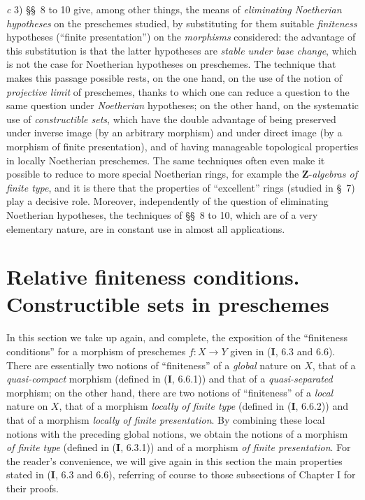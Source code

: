 \medskip
\noindent
\emph{c} 3) §§~8 to 10 give, among other things, the means of
\emph{eliminating Noetherian hypotheses} on the preschemes studied, by
substituting for them suitable \emph{finiteness} hypotheses (``finite
presentation'') on the \emph{morphisms} considered: the advantage of this
substitution is that the latter hypotheses are \emph{stable under base
change}, which is not the case for Noetherian hypotheses on preschemes. The
technique that makes this passage possible rests, on the one hand, on the use
of the notion of \emph{projective limit} of preschemes, thanks to which one
can reduce a question to the same question under \emph{Noetherian}
hypotheses; on the other hand, on the systematic use of
\emph{constructible sets}, which have the double advantage of being preserved
under inverse image (by an arbitrary
morphism) and under direct image (by a morphism of finite presentation), and
of having manageable topological properties in locally Noetherian
preschemes. The same techniques often even make it possible to reduce to
more special Noetherian rings, for example the
$\mathbf Z$-\emph{algebras of finite type}, and it is there that the
properties of ``excellent'' rings (studied in §~7) play a decisive role.
Moreover, independently of the question of eliminating Noetherian
hypotheses, the techniques of §§~8 to 10, which are of a very elementary
nature, are in constant use in almost all applications.

\setcounter{section}{0}


\section{Relative finiteness conditions. Constructible sets in preschemes}
\label{section:IV.1}

In this section we take up again, and complete, the exposition of the
``finiteness conditions'' for a morphism of preschemes $f:X\to Y$ given
in (\textbf{I}, 6.3 and 6.6). There are essentially two notions of ``finiteness'' of
a \emph{global} nature on $X$, that of a \emph{quasi-compact} morphism
(defined in (\textbf{I}, 6.6.1)) and that of a \emph{quasi-separated} morphism; on
the other hand, there are two notions of ``finiteness'' of a \emph{local}
nature on $X$, that of a morphism \emph{locally of finite type} (defined in
(\textbf{I}, 6.6.2)) and that of a morphism \emph{locally of finite presentation}. By
combining these local notions with the preceding global notions, we obtain
the notions of a morphism \emph{of finite type} (defined in (\textbf{I}, 6.3.1)) and
of a morphism \emph{of finite presentation}. For the reader's convenience,
we will give again in this section the main properties stated in (\textbf{I}, 6.3
and 6.6), referring of course to those subsections of Chapter I for their
proofs.


